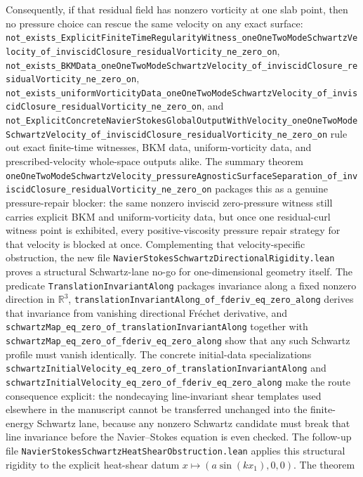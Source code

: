 \documentclass[11pt]{article}
\theoremstyle{remark}
\begin{document}
Consequently, if that residual field has nonzero vorticity at one slab point,
then no pressure choice can rescue the same velocity on any exact surface:
\texttt{not\_exists\_ExplicitFiniteTimeRegularityWitness\_oneOneTwoModeSchwartzVelocity\_of\_inviscidClosure\_residualVorticity\_ne\_zero\_on},
\texttt{not\_exists\_BKMData\_oneOneTwoModeSchwartzVelocity\_of\_inviscidClosure\_residualVorticity\_ne\_zero\_on},
\texttt{not\_exists\_uniformVorticityData\_oneOneTwoModeSchwartzVelocity\_of\_inviscidClosure\_residualVorticity\_ne\_zero\_on},
and
\texttt{not\_ExplicitConcreteNavierStokesGlobalOutputWithVelocity\_oneOneTwoModeSchwartzVelocity\_of\_inviscidClosure\_residualVorticity\_ne\_zero\_on}
rule out exact finite-time witnesses, BKM data, uniform-vorticity data, and
prescribed-velocity whole-space outputs alike.  The summary theorem
\texttt{oneOneTwoModeSchwartzVelocity\_pressureAgnosticSurfaceSeparation\_of\_inviscidClosure\_residualVorticity\_ne\_zero\_on}
packages this as a genuine pressure-repair blocker: the same nonzero inviscid
zero-pressure witness still carries explicit BKM and uniform-vorticity data,
but once one residual-curl witness point is exhibited, every positive-viscosity
pressure repair strategy for that velocity is blocked at once.
Complementing that velocity-specific obstruction, the new file
\texttt{NavierStokesSchwartzDirectionalRigidity.lean} proves a structural
Schwartz-lane no-go for one-dimensional geometry itself.  The predicate
\texttt{TranslationInvariantAlong} packages invariance along a fixed nonzero
direction in \(\mathbb{R}^3\),
\texttt{translationInvariantAlong\_of\_fderiv\_eq\_zero\_along} derives that
invariance from vanishing directional Fr\'echet derivative, and
\texttt{schwartzMap\_eq\_zero\_of\_translationInvariantAlong} together with
\texttt{schwartzMap\_eq\_zero\_of\_fderiv\_eq\_zero\_along} show that any such
Schwartz profile must vanish identically.  The concrete initial-data
specializations
\texttt{schwartzInitialVelocity\_eq\_zero\_of\_translationInvariantAlong} and
\texttt{schwartzInitialVelocity\_eq\_zero\_of\_fderiv\_eq\_zero\_along} make
the route consequence explicit: the nondecaying line-invariant shear templates
used elsewhere in the manuscript cannot be transferred unchanged into the
finite-energy Schwartz lane, because any nonzero Schwartz candidate must break
that line invariance before the Navier--Stokes equation is even checked.
The follow-up file
\texttt{NavierStokesSchwartzHeatShearObstruction.lean} applies this structural
rigidity to the explicit heat-shear datum
\(x \mapsto (a \sin(k x_1),0,0)\).  The theorem
\end{document}
